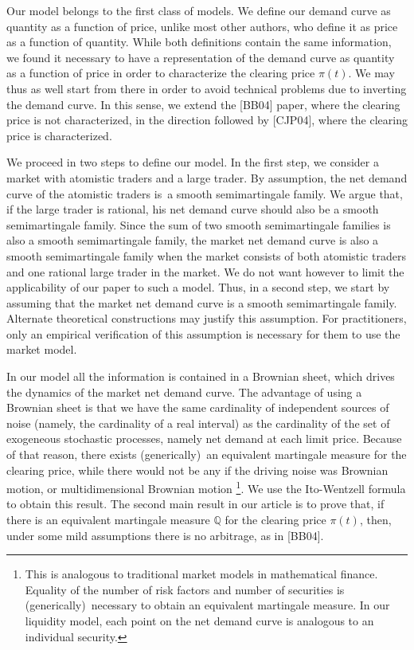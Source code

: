 \documentclass{article}
\begin{document}
Our model belongs to the first class of models. We define our demand curve
as quantity as a function of price, unlike most other authors, who define it
as price as a function of quantity. While both definitions contain the same
information, we found it necessary to have a representation of the demand
curve as quantity as a function of price in order to characterize the
clearing price $\pi (t)$. We may thus as well start from there in order to
avoid technical problems due to inverting the demand curve. In this sense,
we extend the [BB04] paper, where the clearing price is not characterized,
in the direction followed by [CJP04], where the clearing price is
characterized.

We proceed in two steps to define our model. In the first step, we consider
a market with atomistic traders and a large trader. By assumption, the net
demand curve of the atomistic traders is\ a smooth semimartingale family. We
argue that, if the large trader is rational, his net demand curve should
also be a smooth semimartingale family. Since the sum of two smooth
semimartingale families is also a smooth semimartingale family, the market
net demand curve is also a smooth semimartingale family when the market
consists of both atomistic traders and one rational large trader in the
market. We do not want however to limit the applicability of our paper to
such a model. Thus, in a second step, we start by assuming that the market
net demand curve is a smooth semimartingale family. Alternate theoretical
constructions may justify this assumption. For practitioners, only an
empirical verification of this assumption is necessary for them to use the
market model.

In our model all the information is contained in a Brownian sheet, which
drives the dynamics of the market net demand curve. The advantage of using a
Brownian sheet is that we have the same cardinality of independent sources
of noise (namely, the cardinality of a real interval) as the cardinality of
the set of exogeneous stochastic processes, namely net demand at each limit
price. Because of that reason, there exists (generically)\ an equivalent
martingale measure for the clearing price, while there would not be any if
the driving noise was Brownian motion, or multidimensional Brownian motion%
\footnote{%
This is analogous to traditional market models in mathematical finance.
Equality of the number of risk factors and number of securities is
(generically)\ necessary to obtain an equivalent martingale measure. In our
liquidity model, each point on the net demand curve is analogous to an
individual security.}. We use the Ito-Wentzell formula to obtain this
result. The second main result in our article is to prove that, if there is
an equivalent martingale measure $\mathbb{Q}$ for the clearing price $\pi
(t) $, then, under some mild assumptions there is no arbitrage, as in [BB04].
\end{document}
